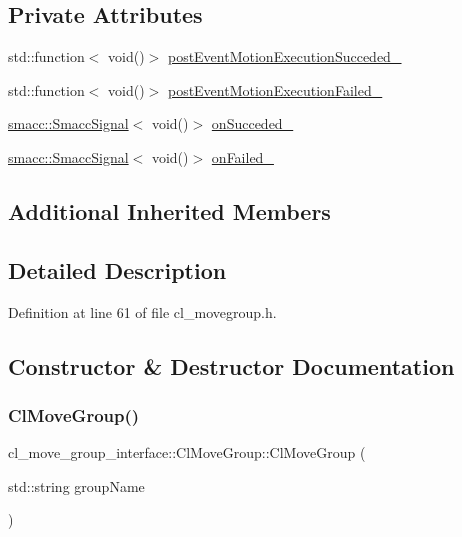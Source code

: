 \subsection*{Private Attributes}
\begin{DoxyCompactItemize}
\item 
std\+::function$<$ void()$>$ \hyperlink{classcl__move__group__interface_1_1ClMoveGroup_a1e95dacf3393a4e4eff40395e8edfccd}{post\+Event\+Motion\+Execution\+Succeded\+\_\+}
\item 
std\+::function$<$ void()$>$ \hyperlink{classcl__move__group__interface_1_1ClMoveGroup_ae7ade7ead3390b444ad4f802de1ec62d}{post\+Event\+Motion\+Execution\+Failed\+\_\+}
\item 
\hyperlink{classsmacc_1_1SmaccSignal}{smacc\+::\+Smacc\+Signal}$<$ void()$>$ \hyperlink{classcl__move__group__interface_1_1ClMoveGroup_aefc24baaaed9ac7615f4dca20b8a077e}{on\+Succeded\+\_\+}
\item 
\hyperlink{classsmacc_1_1SmaccSignal}{smacc\+::\+Smacc\+Signal}$<$ void()$>$ \hyperlink{classcl__move__group__interface_1_1ClMoveGroup_a3e0ea6acf70a0c527864b712b215033b}{on\+Failed\+\_\+}
\end{DoxyCompactItemize}
\subsection*{Additional Inherited Members}


\subsection{Detailed Description}


Definition at line 61 of file cl\+\_\+movegroup.\+h.



\subsection{Constructor \& Destructor Documentation}
\mbox{\label{classcl__move__group__interface_1_1ClMoveGroup_aca9d17734784c5f0ddda33830e630105}} 
\subsubsection{\texorpdfstring{Cl\+Move\+Group()}{ClMoveGroup()}}
{\footnotesize\ttfamily cl\+\_\+move\+\_\+group\+\_\+interface\+::\+Cl\+Move\+Group\+::\+Cl\+Move\+Group (\begin{DoxyParamCaption}\item[{std\+::string}]{group\+Name }\end{DoxyParamCaption})}




